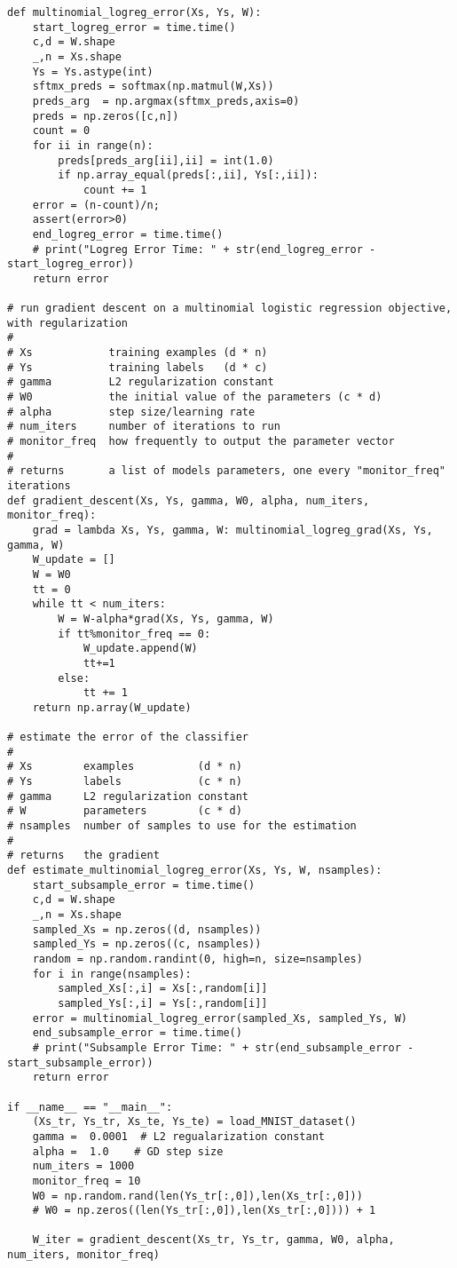 \documentclass{article}
\begin{document}
\begin{lstlisting}
def multinomial_logreg_error(Xs, Ys, W):
	start_logreg_error = time.time()
	c,d = W.shape
	_,n = Xs.shape
	Ys = Ys.astype(int)
	sftmx_preds = softmax(np.matmul(W,Xs))
	preds_arg  = np.argmax(sftmx_preds,axis=0)
	preds = np.zeros([c,n])
	count = 0
	for ii in range(n):
	    preds[preds_arg[ii],ii] = int(1.0)
	    if np.array_equal(preds[:,ii], Ys[:,ii]):
	        count += 1
	error = (n-count)/n;
	assert(error>0)
	end_logreg_error = time.time()
	# print("Logreg Error Time: " + str(end_logreg_error - start_logreg_error))
	return error

# run gradient descent on a multinomial logistic regression objective, with regularization
#
# Xs            training examples (d * n)
# Ys            training labels   (d * c)
# gamma         L2 regularization constant
# W0            the initial value of the parameters (c * d)
# alpha         step size/learning rate
# num_iters     number of iterations to run
# monitor_freq  how frequently to output the parameter vector
#
# returns       a list of models parameters, one every "monitor_freq" iterations
def gradient_descent(Xs, Ys, gamma, W0, alpha, num_iters, monitor_freq):
	grad = lambda Xs, Ys, gamma, W: multinomial_logreg_grad(Xs, Ys, gamma, W)
	W_update = []
	W = W0
	tt = 0
	while tt < num_iters:
		W = W-alpha*grad(Xs, Ys, gamma, W)
		if tt%monitor_freq == 0:
			W_update.append(W)
			tt+=1
		else:
			tt += 1
	return np.array(W_update)

# estimate the error of the classifier
#
# Xs        examples          (d * n)
# Ys        labels            (c * n)
# gamma     L2 regularization constant
# W         parameters        (c * d)
# nsamples  number of samples to use for the estimation
#
# returns   the gradient
def estimate_multinomial_logreg_error(Xs, Ys, W, nsamples):
	start_subsample_error = time.time()
	c,d = W.shape
	_,n = Xs.shape
	sampled_Xs = np.zeros((d, nsamples))
	sampled_Ys = np.zeros((c, nsamples))
	random = np.random.randint(0, high=n, size=nsamples)
	for i in range(nsamples):
		sampled_Xs[:,i] = Xs[:,random[i]]
		sampled_Ys[:,i] = Ys[:,random[i]]
	error = multinomial_logreg_error(sampled_Xs, sampled_Ys, W)
	end_subsample_error = time.time()
	# print("Subsample Error Time: " + str(end_subsample_error - start_subsample_error))
	return error

if __name__ == "__main__":
	(Xs_tr, Ys_tr, Xs_te, Ys_te) = load_MNIST_dataset()
	gamma =  0.0001  # L2 regualarization constant
	alpha =  1.0    # GD step size
	num_iters = 1000
	monitor_freq = 10
	W0 = np.random.rand(len(Ys_tr[:,0]),len(Xs_tr[:,0]))
	# W0 = np.zeros((len(Ys_tr[:,0]),len(Xs_tr[:,0]))) + 1

	W_iter = gradient_descent(Xs_tr, Ys_tr, gamma, W0, alpha, num_iters, monitor_freq)



\end{lstlisting} 
 
 
\end{document}
